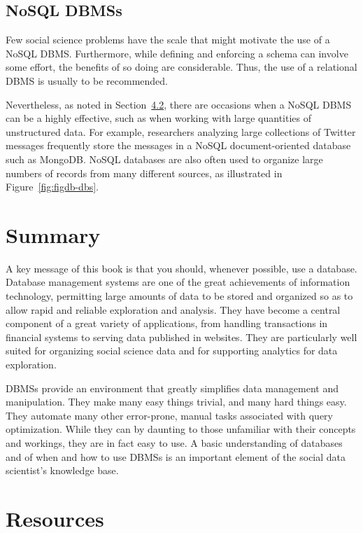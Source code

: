 \documentclass[]{krantz}
\begin{document}
\subsection{NoSQL DBMSs}\label{nosql-dbmss}

Few social science problems have the scale that might motivate the use
of a NoSQL DBMS. Furthermore, while defining and enforcing a schema can
involve some effort, the benefits of so doing are considerable. Thus,
the use of a relational DBMS is usually to be recommended.

Nevertheless, as noted in Section~\protect\hyperlink{sec:db:when}{4.2},
there are occasions when a NoSQL DBMS can be a highly effective, such as
when working with large quantities of unstructured data. For example,
researchers analyzing large collections of Twitter messages frequently
store the messages in a NoSQL document-oriented database such as
MongoDB. NoSQL databases are also often used to organize large numbers
of records from many different sources, as illustrated in
Figure~\ref{fig:figdb-dbs}.

\section{Summary}\label{summary-1}

A key message of this book is that you should, whenever possible, use a
database. Database management systems are one of the great achievements
of information technology, permitting large amounts of data to be stored
and organized so as to allow rapid and reliable exploration and
analysis. They have become a central component of a great variety of
applications, from handling transactions in financial systems to serving
data published in websites. They are particularly well suited for
organizing social science data and for supporting analytics for data
exploration.

DBMSs provide an environment that greatly simplifies data management and
manipulation. They make many easy things trivial, and many hard things
easy. They automate many other error-prone, manual tasks associated with
query optimization. While they can by daunting to those unfamiliar with
their concepts and workings, they are in fact easy to use. A basic
understanding of databases and of when and how to use DBMSs is an
important element of the social data scientist's knowledge base.

\section{Resources}\label{resources-1}
\end{document}
